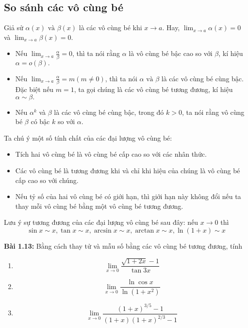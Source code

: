 \subsection*{So sánh các vô cùng bé}
 Giả sử \(\alpha(x)\text{ và }\beta(x)\) là các vô cùng bé khi $x\rightarrow a$. Hay, \(\lim_{x\rightarrow a}\alpha(x)=0\) và \(\lim_{x\rightarrow a}\beta(x)=0\).
\begin{itemize}
    \item Nếu \(\lim_{x\rightarrow a}\frac{\alpha}{\beta}=0\), thì ta nói rằng $\alpha$ là vô cùng bé bậc cao so với $\beta$, kí hiệu $\alpha=o(\beta).$ 
    \item Nếu \(\lim_{x\rightarrow a}\frac{\alpha}{\beta}=m ( m\neq 0)\), thì ta nói \(\alpha\text{ và }\beta\) là các vô cùng bé cùng bậc. Đặc biệt nếu \(m=1\), ta gọi chúng là các vô cùng bé tương đương, kí hiệu $\alpha\sim \beta.$
    \item Nếu \(\alpha^k\) và \(\beta\) là các vô cùng bé cùng bậc, trong đó \(k>0\), ta nói rằng vô cùng bé \(\beta\) có bậc \(k\) so với \(\alpha\).
\end{itemize}
Ta chú ý một số tính chất của các đại lượng vô cùng bé:
\begin{itemize}
    \item Tích hai vô cùng bé là vô cùng bé cấp cao so với các nhân thức.
    \item Các vô cùng bé là tương đương khi và chỉ khi hiệu của chúng là vô cùng bé cấp cao so với chúng.
    \item Nếu tỷ số của hai vô cùng bé có giới hạn, thì giới hạn này không đổi nếu ta thay mỗi vô cùng bé bằng một vô cùng bé tương đương.
\end{itemize}
Lưu ý sự tương đương của các đại lượng vô cùng bé sau đây: nếu \(x\rightarrow 0\) thì \[\sin x\sim x, \tan x\sim x, \arcsin x\sim x, \arctan x\sim x, \ln(1+x)\sim x\]

\textbf{Bài 1.13:} 
Bằng cách thay tử và mẫu số bằng các vô cùng bé tương đương, tính 
\begin{enumerate}[label=(\alph*)]
    \item \[\lim_{x\rightarrow 0}\frac{\sqrt{1+2x}-1}{\tan 3x}\]
    \item \[\lim_{x\rightarrow 0}\frac{\ln \cos x}{\ln (1+x^2)}\]
    \item \[\lim_{x\rightarrow 0}\frac{(1+x)^{3/5}-1}{(1+x)(1+x)^{2/3}-1}\]
\end{enumerate}

